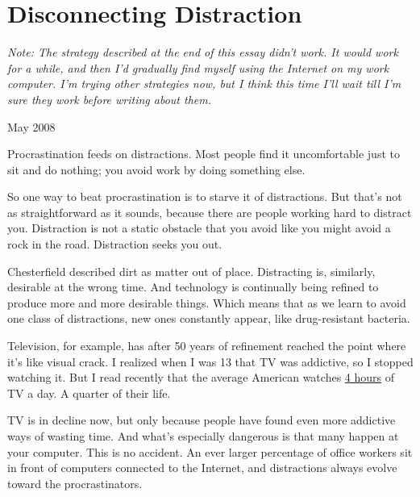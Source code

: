 \chapter{Disconnecting Distraction}


            
              
                

\emph{Note: The strategy described at the end of this essay
                    didn't work. It would work for a while, and then I'd
                    gradually find myself using the Internet on my work
                    computer. I'm trying other strategies now, but I think this
                    time I'll wait till I'm sure they work before writing about
                    them.}

May 2008

Procrastination feeds on
                  distractions. Most people find it uncomfortable just to sit
                  and do nothing; you avoid work by doing something else.

So
                  one way to beat procrastination is to starve it of
                  distractions. But that's not as straightforward as it sounds,
                  because there are people working hard to distract you.
                  Distraction is not a static obstacle that you avoid like you
                  might avoid a rock in the road. Distraction seeks you out.

Chesterfield
                  described dirt as matter out of place. Distracting is,
                  similarly, desirable at the wrong time. And technology is
                  continually being refined to produce more and more desirable
                  things. Which means that as we learn to avoid one class of
                  distractions, new ones constantly appear, like drug-resistant
                  bacteria.

Television, for example, has after 50
                  years of refinement reached the point where it's like visual
                  crack. I realized when I was 13 that TV was addictive, so I
                  stopped watching it. But I read recently that the average
                  American watches
                  \href{http://www.forbes.com/forbes/2003/0929/076.html}{4 hours}
                  of TV a day. A quarter of their life.

TV is in
                  decline now, but only because people have found even more
                  addictive ways of wasting time. And what's especially
                  dangerous is that many happen at your computer. This is no
                  accident. An ever larger percentage of office workers sit in
                  front of computers connected to the Internet, and distractions
                  always evolve toward the procrastinators.

